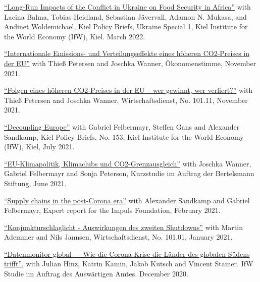\documentclass{article}
\begin{document}
\begin{minipage}[t]{0.8\textwidth}
    \href{https://www.ifw-kiel.de/publications/kiel-policy-brief/ukraine-special/long-run-impacts-of-the-conflict-in-ukraine-on-food-security-in-africa-17165/}{``Long-Run Impacts of the Conflict in Ukraine on Food Security in Africa''} with Lacina Balma, Tobias Heidland, Sebastian Jävervall, Adamon N. Mukasa, and Andinet Woldemichael, Kiel Policy Briefs, Ukraine Special 1, Kiel Institute for the World Economy (IfW), Kiel. March 2022. \par
    \href{https://www.oekonomenstimme.org/artikel/2021/11/internationale-emissions--und-verteilungseffekte-eines-hoeheren-co2-preises-in-der-eu/}{``Internationale Emissions- und Verteilungseffekte eines höheren CO2-Preises in der EU''} with Thieß Petersen and Joschka Wanner, Ökonomenstimme, November 2021. \par
    \href{https://www.wirtschaftsdienst.eu/inhalt/jahr/2021/heft/11/beitrag/folgen-eines-hoeheren-co2-preises-in-der-eu-wer-gewinnt-wer-verliert.html}{``Folgen eines höheren CO2-Preises in der EU – wer gewinnt, wer verliert?''} with Thieß Petersen and Joschka Wanner, Wirtschaftsdienst, No. 101.11, November 2021. \par
    \href{https://www.ifw-kiel.de/publications/kiel-policy-briefs/2021/decoupling-europe-16271/}{``Decoupling Europe''} with Gabriel Felbermayr, Steffen Gans and Alexander Sandkamp, Kiel Policy Briefs, No. 153, Kiel Institute for the World Economy (IfW), Kiel, July 2021. \par
    \href{https://www.bertelsmann-stiftung.de/de/publikationen/publikation/did/eu-klimapolitik-klimaclubs-und-co2-grenzausgleich}{``EU-Klimapolitik, Klimaclubs und CO2-Grenzausgleich''} with Joschka Wanner, Gabriel Felbermayr and Sonja Peterson, Kurzstudie im Auftrag der Bertelsmann Stiftung, June 2021. \par
    \href{https://www.ifw-kiel.de/publications/policy-papers/2021/supply-chains-in-the-post-corona-era-in-german-15841/}{``Supply chains in the post-Corona era''} with Alexander Sandkamp and Gabriel Felbermayr, Expert report for the Impuls Foundation, February 2021. \par
    \href{https://www.wirtschaftsdienst.eu/inhalt/jahr/2021/heft/1/beitrag/auswirkungen-des-zweiten-shutdowns.html}{``Konjunkturschlaglicht - Auswirkungen des zweiten Shutdowns''} with Martin Ademmer and Nils Jannsen, Wirtschaftsdienst, No. 101.01, January 2021. \par
    \href{https://www.ifw-kiel.de/de/publikationen/policy-papers/2021/corona-krise-datenmonitor-global-0/}{``Datenmonitor global — Wie die Corona-Krise die Länder des globalen Südens trifft''}, with Julian Hinz, Katrin Kamin, Jakob Kutsch and Vincent Stamer. IfW Studie im Auftrag des Auswärtigen Amtes. December 2020. \par

\end{minipage}
\end{document}
